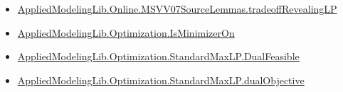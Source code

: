 \documentclass[10pt]{article}
\begin{document}
\begin{itemize}
\item \hyperlink{governing-declaration-7172ae06131d98cd}{Applied\allowbreak{}Modeling\allowbreak{}Lib.\allowbreak{}Online.\allowbreak{}MSVV07\allowbreak{}Source\allowbreak{}Lemmas.\allowbreak{}tradeoff\allowbreak{}Revealing\allowbreak{}LP}
\item \hyperlink{governing-declaration-797bcd85b4b26271}{Applied\allowbreak{}Modeling\allowbreak{}Lib.\allowbreak{}Optimization.\allowbreak{}Is\allowbreak{}Minimizer\allowbreak{}On}
\item \hyperlink{governing-declaration-abdb5787a7626971}{Applied\allowbreak{}Modeling\allowbreak{}Lib.\allowbreak{}Optimization.\allowbreak{}Standard\allowbreak{}Max\allowbreak{}LP.\allowbreak{}Dual\allowbreak{}Feasible}
\item \hyperlink{governing-declaration-b12b4262e1edffd6}{Applied\allowbreak{}Modeling\allowbreak{}Lib.\allowbreak{}Optimization.\allowbreak{}Standard\allowbreak{}Max\allowbreak{}LP.\allowbreak{}dual\allowbreak{}Objective}
\end{itemize}
\end{document}
